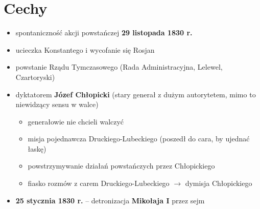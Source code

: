 \documentclass [a4paper, 11pt, oneside]{book}
\begin{document}
    \section{Cechy} %
    \label{sec:cechy}
        \begin{itemize}
            \item spontaniczność akcji powstańczej \textbf{29 listopada 1830 r.}
            \item ucieczka Konstantego i wycofanie się Rosjan
            \item powstanie Rządu Tymczasowego (Rada Administracyjna, Lelewel, Czartoryski)
            \item dyktatorem \textbf{Józef Chłopicki} (stary generał z dużym autorytetem, mimo to niewidzący sensu w walce)
            \begin{itemize}
                \item generałowie nie chcieli walczyć
                \item misja pojednawcza Druckiego-Lubeckiego (poszedł do cara, by ujednać łaskę)
                \item powstrzymywanie działań powstańczych przez Chłopickiego
                \item fiasko rozmów z carem Druckiego-Lubeckiego $\longrightarrow$ dymisja Chłopickiego
            \end{itemize}
            \item \textbf{25 stycznia 1830 r.} -- detronizacja \textbf{Mikołaja I} przez sejm
        \end{itemize}
\end{document}
